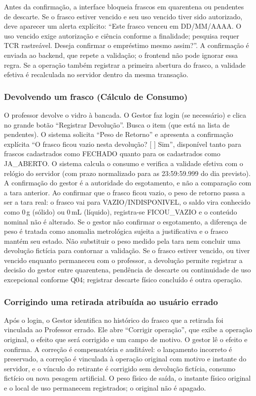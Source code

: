 Antes da confirmação, a interface bloqueia frascos em quarentena ou pendentes de descarte. Se o frasco estiver vencido e seu uso vencido tiver sido autorizado, deve aparecer um alerta explícito: ``Este frasco venceu em DD/MM/AAAA. O uso vencido exige autorização e ciência conforme a finalidade; pesquisa requer TCR rastreável. Deseja confirmar o empréstimo mesmo assim?''. A confirmação é enviada ao backend, que repete a validação; o frontend não pode ignorar essa regra. Se a operação também registrar a primeira abertura do frasco, a validade efetiva é recalculada no servidor dentro da mesma transação.

\subsubsection{Devolvendo um frasco (Cálculo de Consumo)}
O professor devolve o vidro à bancada. O Gestor faz login (se necessário) e clica no grande botão ``Registrar Devolução''. Busca o item (que está na lista de pendentes). O sistema solicita ``Peso de Retorno'' e apresenta a confirmação explícita ``O frasco ficou vazio nesta devolução? [ ] Sim'', disponível tanto para frascos cadastrados como FECHADO quanto para os cadastrados como JA\_ABERTO. O sistema calcula o consumo e verifica a validade efetiva com o relógio do servidor (com prazo normalizado para as 23:59:59.999 do dia previsto). A confirmação do gestor é a autoridade do esgotamento, e não a comparação com a tara anterior. Ao confirmar que o frasco ficou vazio, o peso de retorno passa a ser a tara real: o frasco vai para VAZIO/INDISPONIVEL, o saldo vira conhecido como 0\,g (sólido) ou 0\,mL (líquido), registra-se FICOU\_VAZIO e o conteúdo nominal não é alterado. Se o gestor não confirmar o esgotamento, a diferença de peso é tratada como anomalia metrológica sujeita a justificativa e o frasco mantém seu estado. Não substituir o peso medido pela tara nem concluir uma devolução fictícia para contornar a validação. Se o frasco estiver vencido, ou tiver vencido enquanto permaneceu com o professor, a devolução permite registrar a decisão do gestor entre quarentena, pendência de descarte ou continuidade de uso excepcional conforme Q04; registrar descarte físico concluído é outra operação.

\subsubsection{Corrigindo uma retirada atribuída ao usuário errado}
Após o login, o Gestor identifica no histórico do frasco que a retirada foi vinculada ao Professor errado. Ele abre ``Corrigir operação'', que exibe a operação original, o efeito que será corrigido e um campo de motivo. O gestor lê o efeito e confirma. A correção é compensatória e auditável: o lançamento incorreto é preservado, a correção é vinculada à operação original com motivo e instante do servidor, e o vínculo do retirante é corrigido sem devolução fictícia, consumo fictício ou nova pesagem artificial. O peso físico de saída, o instante físico original e o local de uso permanecem registrados; o original não é apagado.

